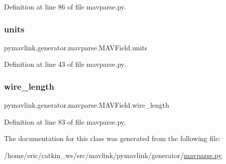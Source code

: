 Definition at line 86 of file mavparse.\+py.

\mbox{\label{classpymavlink_1_1generator_1_1mavparse_1_1MAVField_a945c22c5e49d09b90217c28f23825e6a}} 
\subsubsection{\texorpdfstring{units}{units}}
{\footnotesize\ttfamily pymavlink.\+generator.\+mavparse.\+M\+A\+V\+Field.\+units}



Definition at line 43 of file mavparse.\+py.

\mbox{\label{classpymavlink_1_1generator_1_1mavparse_1_1MAVField_abddf1790763e5a2e23ab8b5ff2960fa2}} 
\subsubsection{\texorpdfstring{wire\_length}{wire\_length}}
{\footnotesize\ttfamily pymavlink.\+generator.\+mavparse.\+M\+A\+V\+Field.\+wire\+\_\+length}



Definition at line 83 of file mavparse.\+py.



The documentation for this class was generated from the following file\+:\begin{DoxyCompactItemize}
\item 
/home/eric/catkin\+\_\+ws/src/mavlink/pymavlink/generator/\mbox{\hyperlink{mavparse_8py}{mavparse.\+py}}\end{DoxyCompactItemize}
